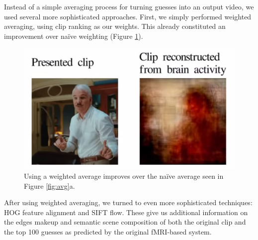 Instead of a simple averaging process for turning guesses into an output video, we used several more sophisticated approaches.  First, we simply performed weighted averaging, using clip ranking as our weights.  This already constituted an improvement over na\"{i}ve weighting (Figure \ref{fig:weighted}).

\begin{figure}[t]
\centering
    \includegraphics[width=1.0\columnwidth]{figures/average.png}
\caption{Using a weighted average improves over the na\"{i}ve average seen in Figure \ref{fig:avg}a. }
\label{fig:weighted}
\end{figure}


After using weighted averaging, we turned to even more sophisticated techniques: HOG feature alignment and SIFT flow.  These give us additional information on the edges makeup and semantic scene composition of both the original clip and the top 100 guesses as predicted by the original fMRI-based system.